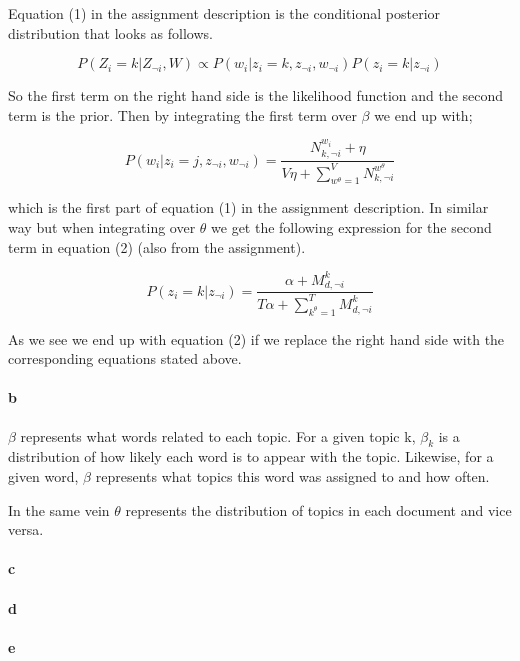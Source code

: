 \documentclass{article}
\begin{document}
Equation (1) in the assignment description is the conditional posterior
distribution that looks as follows.

\begin{equation*}
P(Z_i = k \vert Z_{\neg i}, W) \propto P(w_i \vert z_i = k, z_{\neg i}, w_{\neg i})P(z_i = k \vert z_{\neg i })
\end{equation*}

So the first term on the right hand side is the likelihood function and the
second term is the prior. Then by integrating the first term over $\beta$ we
end up with;

\begin{equation*}
P(w_i \vert z_i = j, z_{\neg i}, w_{\neg i}) = \frac{ N^{w_i}_{k,\neg i} + \eta }{V\eta + \sum_{w^{\theta}=1}^V N^{w^\theta}_{k, \neg i}}
\end{equation*}

which is the first part of equation (1) in the assignment description. In
similar way but when integrating over $\theta$ we get the following expression
for the second term in equation (2) (also from the assignment).

\begin{equation*}
P(z_i = k \vert z_{\neg i}) = \frac{\alpha + M^{k}_{d,\neg i}}{T\alpha + \sum_{k^\theta=1}^T M^k_{d, \neg i} }
\end{equation*}

As we see we end up with equation (2) if we replace the right hand side with
the corresponding equations stated above.

\paragraph{b}

$\beta$ represents what words related to each topic. For a given topic k,
$\beta_k$ is a distribution of how likely each word is to appear with the
topic. Likewise, for a given word, $\beta$ represents what topics this word was
assigned to and how often.

In the same vein $\theta$ represents the distribution of topics in each
document and vice versa.

\paragraph{c}
\paragraph{d}
\paragraph{e}
\end{document}
